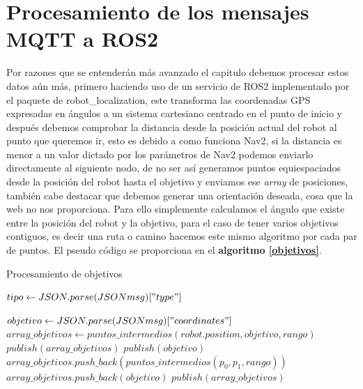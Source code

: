 \section{Procesamiento de los mensajes MQTT a ROS2}
Por razones que se entenderán más avanzado el capitulo debemos procesar estos datos aún más, primero haciendo uso de un servicio de ROS2 
implementado por el paquete de robot\_localization, este transforma las coordenadas GPS expresadas en ángulos a un sistema cartesiano 
centrado en el punto de inicio y después debemos comprobar la distancia desde la posición actual del robot al punto que queremos ir, 
esto es debido a como funciona Nav2, si la distancia es menor a un valor dictado por los parámetros de Nav2 podemos enviarlo directamente 
al siguiente nodo, de no ser así generamos puntos equiespaciados desde la posición del robot hasta el objetivo y enviamos ese \textit{array} 
de posiciones, también cabe destacar que debemos generar una orientación deseada, cosa que la web no nos proporciona.
Para ello simplemente calculamos el ángulo que existe entre la posición del robot y la objetivo, para el caso de tener varios objetivos contiguos, es decir una 
ruta o camino hacemos este mismo algoritmo por cada par de puntos. El pseudo código se proporciona en el \textbf{algoritmo \ref{objetivos}}.

\begin{algorithm}[H]
  \caption{Procesamiento de objetivos}\label{objetivos}
  \begin{algorithmic}[1]
     
        \State $tipo\gets JSON.parse(JSONmsg)["type"]$
       
            \State $objetivo\gets JSON.parse(JSONmsg)["coordinates"]$
                \State $array\_objetivos \gets puntos\_intermedios(robot.position, objetivo, rango)$ 
                \State $publish(array\_objetivos)$
             \Else
                \State $publish(objetivo)$
             \EndIf
        \Else
             
                \State $array\_objetivos.push\_back( puntos\_intermedios(p_0, p_1, rango))$
             \Else
                \State $array\_objetivos.push\_back(objetivo)$
             \EndIf
            \EndFor
            \State $publish(array\_objetivos)$
        \EndIf
    \EndProcedure
  \end{algorithmic}
\end{algorithm}

